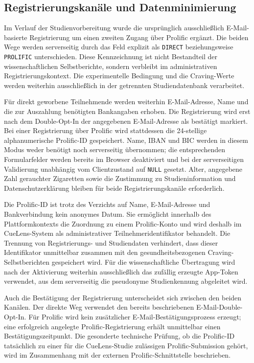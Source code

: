 
\begin{neu}
\section{Registrierungskanäle und Datenminimierung}

Im Verlauf der Studienvorbereitung wurde die ursprünglich ausschließlich E-Mail-basierte Registrierung um einen zweiten Zugang über Prolific ergänzt. Die beiden Wege werden serverseitig durch das Feld  explizit als \texttt{DIRECT} beziehungsweise \texttt{PROLIFIC} unterschieden. Diese Kennzeichnung ist nicht Bestandteil der wissenschaftlichen Selbstberichte, sondern verbleibt im administrativen Registrierungskontext. Die experimentelle Bedingung und die Craving-Werte werden weiterhin ausschließlich in der getrennten Studiendatenbank verarbeitet.

Für direkt geworbene Teilnehmende werden weiterhin E-Mail-Adresse, Name und die zur Auszahlung benötigten Bankangaben erhoben. Die Registrierung wird erst nach dem Double-Opt-In der angegebenen E-Mail-Adresse als bestätigt markiert. Bei einer Registrierung über Prolific wird stattdessen die 24-stellige alphanumerische Prolific-ID gespeichert. Name, IBAN und BIC werden in diesem Modus weder benötigt noch serverseitig übernommen; die entsprechenden Formularfelder werden bereits im Browser deaktiviert und bei der serverseitigen Validierung unabhängig vom Clientzustand auf \texttt{NULL} gesetzt. Alter, angegebene Zahl gerauchter Zigaretten sowie die Zustimmung zu Studieninformation und Datenschutzerklärung bleiben für beide Registrierungskanäle erforderlich.

Die Prolific-ID ist trotz des Verzichts auf Name, E-Mail-Adresse und Bankverbindung kein anonymes Datum. Sie ermöglicht innerhalb des Plattformkontexts die Zuordnung zu einem Prolific-Konto und wird deshalb im CueLens-System als administrativer Teilnehmeridentifikator behandelt. Die Trennung von Registrierungs- und Studiendaten verhindert, dass dieser Identifikator unmittelbar zusammen mit den gesundheitsbezogenen Craving-Selbstberichten gespeichert wird. Für die wissenschaftliche Übertragung wird nach der Aktivierung weiterhin ausschließlich das zufällig erzeugte App-Token verwendet, aus dem serverseitig die pseudonyme Studienkennung abgeleitet wird.

Auch die Bestätigung der Registrierung unterscheidet sich zwischen den beiden Kanälen. Der direkte Weg verwendet den bereits beschriebenen E-Mail-Double-Opt-In. Für Prolific wird kein zusätzlicher E-Mail-Bestätigungsprozess erzeugt; eine erfolgreich angelegte Prolific-Registrierung erhält unmittelbar einen Bestätigungszeitpunkt. Die gesonderte technische Prüfung, ob die Prolific-ID tatsächlich zu einer für die CueLens-Studie zulässigen Prolific-Submission gehört, wird im Zusammenhang mit der externen Prolific-Schnittstelle beschrieben.


\end{neu}
